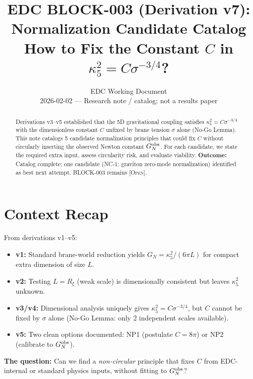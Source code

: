 \documentclass[11pt,a4paper]{article}
\title{\textbf{EDC BLOCK-003 (Derivation v7):}\\[0.3em]
Normalization Candidate Catalog\\[0.3em]
\large How to Fix the Constant $C$ in $\kappa_5^2 = C \sigma^{-3/4}$?}
\author{EDC Working Document\\[0.5em]
\small 2026-02-02 --- Research note / catalog; not a results paper}
\date{}
\newcommand{\Open}{\textsc{[Open]}}
\begin{document}
\maketitle

\begin{abstract}
Derivations v3--v5 established that the 5D gravitational coupling satisfies
$\kappa_5^2 = C \sigma^{-3/4}$ with the dimensionless constant $C$ unfixed
by brane tension $\sigma$ alone (No-Go Lemma). This note catalogs 5 candidate
normalization principles that could fix $C$ without circularly inserting the
observed Newton constant $G_N^{\rm obs}$. For each candidate, we state the
required extra input, assess circularity risk, and evaluate viability.
\textbf{Outcome:} Catalog complete; one candidate (NC-1: graviton zero-mode
normalization) identified as best next attempt. BLOCK-003 remains \Open.
\end{abstract}

\tableofcontents
\newpage

\section{Context Recap}

From derivations v1--v5:

\begin{itemize}
\item \textbf{v1:} Standard brane-world reduction yields $G_N = \kappa_5^2 / (6\pi L)$
for compact extra dimension of size $L$.

\item \textbf{v2:} Testing $L = R_\xi$ (weak scale) is dimensionally consistent
but leaves $\kappa_5^2$ unknown.

\item \textbf{v3/v4:} Dimensional analysis uniquely gives
$\kappa_5^2 = C \sigma^{-3/4}$, but $C$ cannot be fixed by $\sigma$ alone
(No-Go Lemma: only 2 independent scales available).

\item \textbf{v5:} Two clean options documented: NP1 (postulate $C = 8\pi$) or
NP2 (calibrate to $G_N^{\rm obs}$).
\end{itemize}

\textbf{The question:} Can we find a \textit{non-circular} principle that
fixes $C$ from EDC-internal or standard physics inputs, without fitting to
$G_N^{\rm obs}$?
\end{document}
